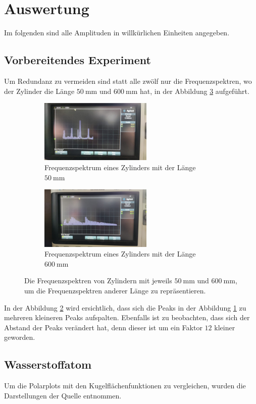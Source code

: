 \section{Auswertung}
\label{sec:Auswertung}
Im folgenden sind alle Amplituden in willkürlichen Einheiten angegeben.
\subsection{Vorbereitendes Experiment}
Um Redundanz zu vermeiden sind statt alle zwölf nur die Frequenzspektren, wo der Zylinder die Länge $\qty{50}{\milli\meter}$ und $\qty{600}{\milli\meter}$ hat, in der Abbildung
\ref{fig:os} aufgeführt.
\begin{figure}
\begin{subfigure}{0.48\textwidth}%
\centering%
\includegraphics[height=3cm]{data_scripts/1.jpeg}%
\caption{Frequenzspektrum eines Zylinders mit der Länge $\qty{50}{\milli\meter}$}%
\label{fig:50os}%
\end{subfigure}%
\hfill%
\begin{subfigure}{0.48\textwidth}%
\centering%
\includegraphics[height=3cm]{data_scripts/12.jpeg}%
\caption{Frequenzspektrum eines Zylinders mit der Länge $\qty{600}{\milli\meter}$}%
\label{fig:600os}%
\end{subfigure}%
\caption{Die Frequenzspektren von Zylindern mit jeweils $\qty{50}{\milli\meter}$ und $\qty{600}{\milli\meter}$, um die Frequenzspektren anderer Länge zu repräsentieren.}%
\label{fig:os}%
\end{figure}%
In der Abbildung \ref{fig:600os} wird ersichtlich, dass sich die Peaks in der Abbildung \ref{fig:50os} zu mehreren kleineren Peaks aufspalten.
Ebenfalls ist zu beobachten, dass sich der Abstand der Peaks verändert hat, denn dieser ist um ein Faktor $12$ kleiner geworden.
\subsection{Wasserstoffatom}
Um die Polarplots mit den Kugelflächenfunktionen zu vergleichen, wurden die Darstellungen der Quelle \cite{sphericalharmonics} entnommen.

